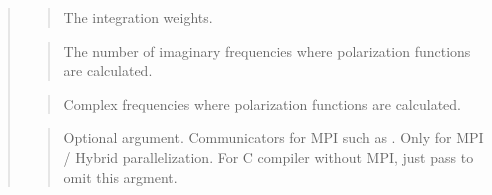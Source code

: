 \documentclass[letterpaper,10pt,pdftex,openany,english]{sphinxmanual}
\begin{document}
\begin{quote}
\begin{quote}
\sphinxAtStartPar
The integration weights.
\end{quote}

\begin{sphinxVerbatim}[commandchars=\\\{\}]
\end{sphinxVerbatim}
\begin{quote}

\sphinxAtStartPar
The number of imaginary frequencies where
polarization functions are calculated.
\end{quote}

\begin{sphinxVerbatim}[commandchars=\\\{\}]
\end{sphinxVerbatim}
\begin{quote}

\sphinxAtStartPar
Complex frequencies where
polarization functions are calculated.
\end{quote}

\begin{sphinxVerbatim}[commandchars=\\\{\}]
\end{sphinxVerbatim}
\begin{quote}

\sphinxAtStartPar
Optional argument. Communicators for MPI such as .
Only for MPI / Hybrid parallelization.
For C compiler without MPI, just pass  to omit this argment.
\end{quote}
\end{quote}

\sphinxstepscope
\end{document}
